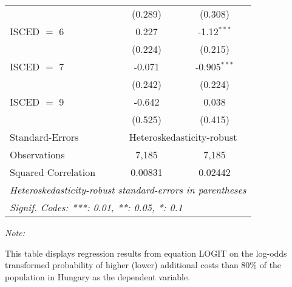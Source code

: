 \begin{table}[htbp!]
\begin{adjustbox}{width = 1\textwidth, max height = 0.95\textheight, center}
\begin{threeparttable}[b]
\begin{tabular}{lcc}
                                 & (0.289)        & (0.308)\\   
            ISCED $=$ 6          & 0.227          & -1.12$^{***}$\\   
                                 & (0.224)        & (0.215)\\   
            ISCED $=$ 7          & -0.071         & -0.905$^{***}$\\   
                                 & (0.242)        & (0.224)\\   
            ISCED $=$ 9          & -0.642         & 0.038\\   
                                 & (0.525)        & (0.415)\\   
            \midrule 
            Standard-Errors & \multicolumn{2}{c}{Heteroskedasticity-robust} \\ 
            Observations         & 7,185          & 7,185\\  
            Squared Correlation  & 0.00831        & 0.02442\\  
            \midrule \midrule
            \multicolumn{3}{l}{\emph{Heteroskedasticity-robust standard-errors in parentheses}}\\
            \multicolumn{3}{l}{\emph{Signif. Codes: ***: 0.01, **: 0.05, *: 0.1}}\\
         \end{tabular}
         
         \begin{tablenotes}\item \medskip \textit{Note:}
            \item This table displays regression results from equation LOGIT on the log-odds transformed probability of higher (lower) additional costs than 80\% of the population in Hungary as the dependent variable. 
         \end{tablenotes}
      \end{threeparttable}
   \end{adjustbox}
\end{table}


